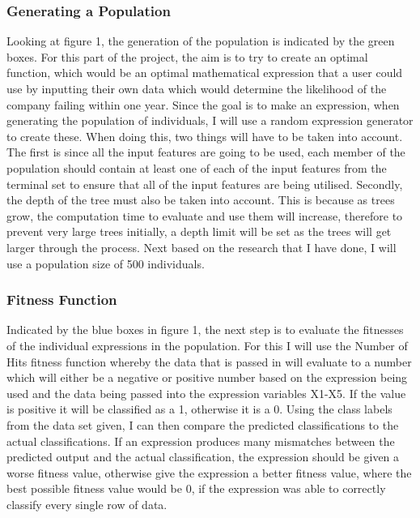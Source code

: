 \documentclass[11pt]{article}
\begin{document}
\subsubsection{Generating a Population}
Looking at figure 1, the generation of the population is indicated by the green boxes. For this part of the project, the aim is to try to create an optimal function, which would be an optimal mathematical expression that a user could use by inputting their own data which would determine the likelihood of the company failing within one year. Since the goal is to make an expression, when generating the population of individuals, I will use a random expression generator to create these. When doing this, two things will have to be taken into account. The first is since all the input features are going to be used, each member of the population should contain at least one of each of the input features from the terminal set to ensure that all of the input features are being utilised. Secondly, the depth of the tree must also be taken into account. This is because as trees grow, the computation time to evaluate and use them will increase, therefore to prevent very large trees initially, a depth limit will be set as the trees will get larger through the process.   Next based on the research that I have done, I will use a population size of 500 individuals.
\subsubsection{Fitness Function}
Indicated by the blue boxes in figure 1, the next step is to evaluate the fitnesses of the individual expressions in the population. For this I will use the Number of Hits fitness function whereby the data that is passed in will evaluate to a number which will either be a negative or positive number based on the expression being used and the data being passed into the expression variables X1-X5. If the value is positive it will be classified as a 1, otherwise it is a 0. Using the class labels from the data set given, I can then compare the predicted classifications to the actual classifications. If an expression produces many mismatches between the predicted output and the actual classification, the expression should be given a worse fitness value, otherwise give the expression a better fitness value, where the best possible fitness value would be 0, if the expression was able to correctly classify every single row of data. 
\end{document}
